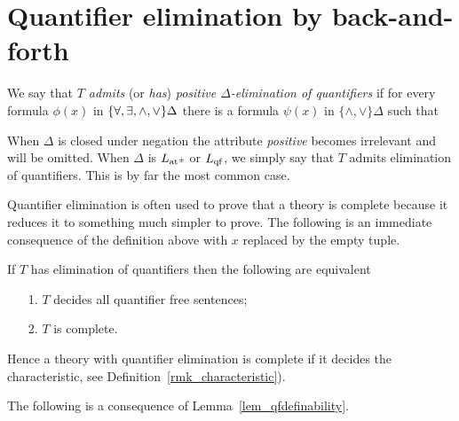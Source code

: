 \section{Quantifier elimination by back-and-forth}
\label{eliminazionequantificatoricriterio}

We say that \emph{$T$ admits\/} (or \emph{has\/}) \emph{positive $\Delta$-elimination of quantifiers\/} if for every formula $\phi(x)$ in $\{\forall,\exists,\mathord\wedge,\mathord\vee\}\Delta$ there is a formula $\psi(x)$ in $\{\mathord\wedge,\mathord\vee\}\Delta$ such that


When $\Delta$ is closed under negation the attribute \textit{positive\/} becomes irrelevant and will be omitted. When $\Delta$ is $L_{{\tiny\rm at^\pm}}\hskip-.3ex$ or $L_{\rm qf}$, we simply say that $T$ admits elimination of quantifiers. This is by far the most common case.

Quantifier elimination is often used to prove that a theory is complete because it reduces it to something much simpler to prove. The following is an immediate consequence of the definition above with $x$ replaced by the empty tuple.

\begin{remark}
If $T$ has elimination of quantifiers then the following are equivalent 
\begin{itemize}
\item[1.] $T$ decides all quantifier free sentences;
\item[2.] $T$ is complete.
\end{itemize}
Hence a theory with quantifier elimination is complete if it decides the characteristic, see Definition~\ref{rmk_characteristic}).\QED
\end{remark}


The following is a consequence of Lemma~\ref{lem_qfdefinability}.

